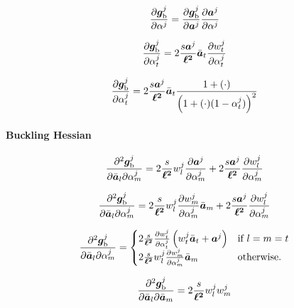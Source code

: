 \begin{equation}
    \frac{\partial\bm{g}_\text{b}^j}{\partial\alpha^j}=\frac{\partial\bm{g}_\text{b}^j}{\partial\bm{a}^j} \frac{\partial\bm{a}^j}{\partial\alpha^j}
\end{equation}

\begin{equation}
    \frac{\partial\bm{g}_\text{b}^j}{\partial\alpha^j_t}= 2\frac{s\bm{a}^j}{\bm{\ell^2}}\bar{\bm{a}}_t \frac{\partial w_t^j}{\partial\alpha_t^j}
\end{equation}

\begin{equation}
    \frac{\partial\bm{g}_\text{b}^j}{\partial\alpha^j_t}= 2\frac{s\bm{a}^j}{\bm{\ell^2}}\bar{\bm{a}}_t \frac{1+(\cdot)}{\left(1+(\cdot)(1-\alpha_t^j)\right)^2}
\end{equation}

\paragraph*{Buckling Hessian}

\begin{equation}
    \frac{\partial^2\bm{g}_\text{b}^j}{\partial{\bar{\bm{a}}_l}\partial\alpha_m^j} =  2\frac{s}{\bm{\ell^2}} w_l^j \frac{\partial\bm{a}^j}{\partial\alpha^j_m} + 2\frac{s\bm{a}^j}{\bm{\ell^2}} \frac{\partial w_l^j}{\partial\alpha_m^j}
\end{equation}

\begin{equation}
    \frac{\partial^2\bm{g}_\text{b}^j}{\partial{\bar{\bm{a}}_l}\partial\alpha_m^j} = 2\frac{s}{\bm{\ell^2}}w_l^j \frac{\partial w_m^j}{\partial\alpha_m^j}  \bar{\bm{a}}_m + 2\frac{s\bm{a}^j}{\bm{\ell^2}} \frac{\partial w_l^j}{\partial\alpha_m^j}
\end{equation}

\begin{equation}
    \frac{\partial^2\bm{g}_\text{b}^j}{\partial{\bar{\bm{a}}_l}\partial\alpha_m^j}=
    \begin{cases}
         2\frac{s}{\bm{\ell^2}} \frac{\partial w_t^j}{\partial\alpha_t^j}\left( w_t^j \bar{\bm{a}}_t + \bm{a}^j \right) & \text{if }l=m=t \\
         2\frac{s}{\bm{\ell^2}}w_l^j \frac{\partial w_m^j}{\partial\alpha_m^j}  \bar{\bm{a}}_m & \text{otherwise.}
        
    \end{cases}
\end{equation}

\begin{equation}
    \frac{\partial^2\bm{g}_\text{b}^j}{\partial\bar{\bm{a}}_l\partial\bar{\bm{a}}_m} = 2\frac{s}{\bm{\ell^2}} w_l^j w_m^j
\end{equation}

